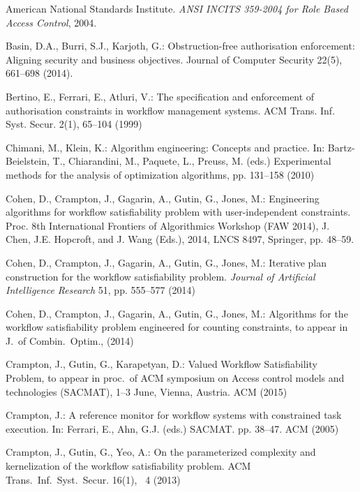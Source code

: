 \documentclass[runningheads,proof]{llncs}
\begin{document}
\begin{thebibliography}{10}
\providecommand{\url}[1]{\texttt{#1}}
\providecommand{\urlprefix}{URL }

American National Standards Institute. \emph{ANSI INCITS 359-2004 for Role Based Access Control}, 2004.

Basin, D.A., Burri, S.J., Karjoth, G.:
Obstruction-free authorisation enforcement: Aligning security and business objectives. 
Journal of Computer Security 22(5), 661--698 (2014).



Bertino, E., Ferrari, E., Atluri, V.: The specification and enforcement of
  authorisation constraints in workflow management systems. ACM Trans. Inf.
  Syst. Secur.  2(1),  65--104 (1999)

Chimani, M., Klein, K.: Algorithm engineering: Concepts and practice. In:
  Bartz-Beielstein, T., Chiarandini, M., Paquete, L., Preuss, M. (eds.)
  Experimental methods for the analysis of optimization algorithms, pp.
  131--158 (2010)

Cohen, D., Crampton, J., Gagarin, A., Gutin, G., Jones, M.: 
Engineering algorithms for workflow satisfiability problem with user-independent constraints. 
Proc. 8th International Frontiers of Algorithmics Workshop (FAW 2014), J. Chen, J.E. Hopcroft, and J. Wang (Eds.), 2014, LNCS 8497, Springer, pp. 48--59.

Cohen, D., Crampton, J., Gagarin, A., Gutin, G., Jones, M.: Iterative plan
  construction for the workflow satisfiability problem. \emph{Journal of Artificial Intelligence Research} 51, pp. 555--577 (2014)
  
Cohen, D., Crampton, J., Gagarin, A., Gutin, G., Jones, M.: 
Algorithms for the workflow satisfiability problem engineered for counting constraints, to appear in J.\ of Combin.\ Optim., (2014)

Crampton, J., Gutin, G., Karapetyan, D.: 
Valued Workflow Satisfiability Problem, to appear in proc.\ of ACM symposium on Access control models and technologies (SACMAT), 1–3 June, Vienna, Austria.  ACM (2015)

Crampton, J.: A reference monitor for workflow systems with constrained task
execution. In: Ferrari, E., Ahn, G.J. (eds.) SACMAT. pp. 38--47. ACM (2005)



Crampton, J., Gutin, G., Yeo, A.: On the parameterized complexity and
  kernelization of the workflow satisfiability problem. ACM Trans.\ Inf.\ Syst.\ Secur.  16(1), ~4 (2013)


\end{thebibliography}
\end{document}
